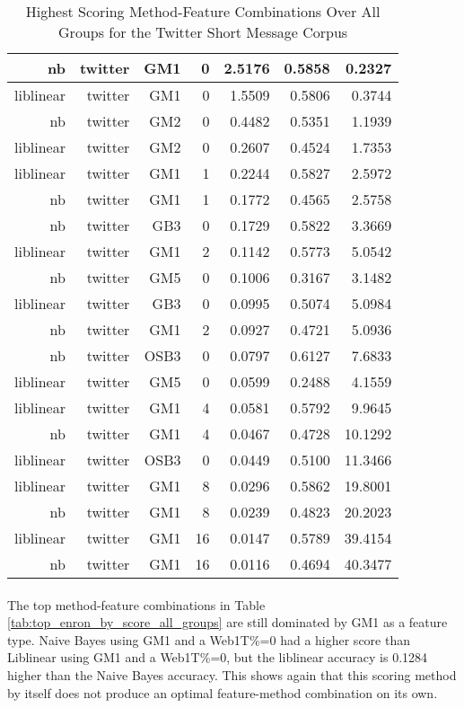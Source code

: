 \begin{table}[htbp!]
\begin{center}
\begin{tabular}{ | r | r | r | r | r | r | r | }
		nb & twitter & GM1 & 0 & 2.5176 & 0.5858 & 0.2327\\ \hline 
		liblinear & twitter & GM1 & 0 & 1.5509 & 0.5806 & 0.3744\\ \hline 
		nb & twitter & GM2 & 0 & 0.4482 & 0.5351 & 1.1939\\ \hline 
		liblinear & twitter & GM2 & 0 & 0.2607 & 0.4524 & 1.7353\\ \hline 
		liblinear & twitter & GM1 & 1 & 0.2244 & 0.5827 & 2.5972\\ \hline 
		nb & twitter & GM1 & 1 & 0.1772 & 0.4565 & 2.5758\\ \hline 
		nb & twitter & GB3 & 0 & 0.1729 & 0.5822 & 3.3669\\ \hline 
		liblinear & twitter & GM1 & 2 & 0.1142 & 0.5773 & 5.0542\\ \hline 
		nb & twitter & GM5 & 0 & 0.1006 & 0.3167 & 3.1482\\ \hline 
		liblinear & twitter & GB3 & 0 & 0.0995 & 0.5074 & 5.0984\\ \hline 
		nb & twitter & GM1 & 2 & 0.0927 & 0.4721 & 5.0936\\ \hline 
		nb & twitter & OSB3 & 0 & 0.0797 & 0.6127 & 7.6833\\ \hline 
		liblinear & twitter & GM5 & 0 & 0.0599 & 0.2488 & 4.1559\\ \hline 
		liblinear & twitter & GM1 & 4 & 0.0581 & 0.5792 & 9.9645\\ \hline 
		nb & twitter & GM1 & 4 & 0.0467 & 0.4728 & 10.1292\\ \hline 
		liblinear & twitter & OSB3 & 0 & 0.0449 & 0.5100 & 11.3466\\ \hline 
		liblinear & twitter & GM1 & 8 & 0.0296 & 0.5862 & 19.8001\\ \hline 
		nb & twitter & GM1 & 8 & 0.0239 & 0.4823 & 20.2023\\ \hline 
		liblinear & twitter & GM1 & 16 & 0.0147 & 0.5789 & 39.4154\\ \hline 
		nb & twitter & GM1 & 16 & 0.0116 & 0.4694 & 40.3477\\ \hline 
		\end{tabular}
		\caption{Highest Scoring Method-Feature Combinations Over All Groups for the Twitter Short Message Corpus}
		\label{tab:top_twitter_by_score_all_groups}
	\end{center}
\end{table}

\paragraph*{} The top method-feature combinations in Table \ref{tab:top_enron_by_score_all_groups} are still dominated by GM1 as a feature type.  Naive Bayes using GM1 and a Web1T\%=0 had a higher score than Liblinear using GM1 and a Web1T\%=0, but the liblinear accuracy is 0.1284 higher than the Naive Bayes accuracy.  This shows again that this scoring method by itself does not produce an optimal feature-method combination on its own.


